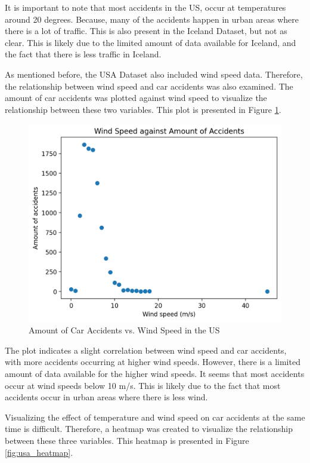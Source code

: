 \documentclass{article}
\begin{document}
It is important to  note that most accidents in the US, occur at temperatures around 20 degrees. Because, many of the accidents happen in urban areas where there is a lot of traffic. This is also present in the Iceland Dataset, but not as clear. This is likely due to the limited amount of data available for Iceland, and the fact that there is less traffic in Iceland.

As mentioned before, the USA Dataset also included wind speed data. Therefore, the relationship between wind speed and car accidents was also examined. The amount of car accidents was plotted against wind speed to visualize the relationship between these two variables. This plot is presented in Figure \ref{fig:usa_accidents_vs_wind}.

\begin{figure}[h!]
    \centering
    \includegraphics[scale=0.5]{../figures/highres/usa_wind_against_accidents.png}
    \caption{Amount of Car Accidents vs. Wind Speed in the US}
    \label{fig:usa_accidents_vs_wind}
\end{figure}


The plot indicates a slight correlation between wind speed and car accidents, with more accidents occurring at higher wind speeds. However, there is a limited amount of data available for the higher wind speeds. It seems that most accidents occur at wind speeds below 10 m/s. This is likely due to the fact that most accidents occur in urban areas where there is less wind.

Visualizing the effect of temperature and wind speed on car accidents at the same time is difficult. Therefore, a heatmap was created to visualize the relationship between these three variables. This heatmap is presented in Figure \ref{fig:usa_heatmap}.
\end{document}
